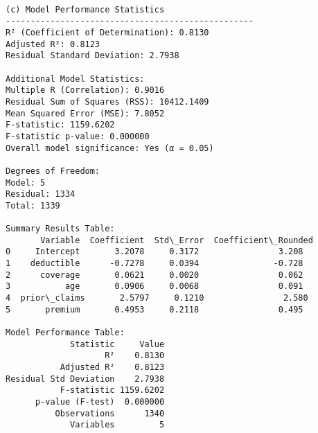 \documentclass[8pt, twocolumn]{extarticle}
\begin{document}
    \begin{Verbatim}[commandchars=\\\{\}]

(c) Model Performance Statistics
--------------------------------------------------
R² (Coefficient of Determination): 0.8130
Adjusted R²: 0.8123
Residual Standard Deviation: 2.7938

Additional Model Statistics:
Multiple R (Correlation): 0.9016
Residual Sum of Squares (RSS): 10412.1409
Mean Squared Error (MSE): 7.8052
F-statistic: 1159.6202
F-statistic p-value: 0.000000
Overall model significance: Yes (α = 0.05)

Degrees of Freedom:
Model: 5
Residual: 1334
Total: 1339

Summary Results Table:
       Variable  Coefficient  Std\_Error  Coefficient\_Rounded
0     Intercept       3.2078     0.3172                3.208
1    deductible      -0.7278     0.0394               -0.728
2      coverage       0.0621     0.0020                0.062
3           age       0.0906     0.0068                0.091
4  prior\_claims       2.5797     0.1210                2.580
5       premium       0.4953     0.2118                0.495

Model Performance Table:
             Statistic     Value
                    R²    0.8130
           Adjusted R²    0.8123
Residual Std Deviation    2.7938
           F-statistic 1159.6202
      p-value (F-test)  0.000000
          Observations      1340
             Variables         5
    \end{Verbatim}

    \begin{center}
    \end{center}
    { \hspace*{\fill} \\}
    
\end{document}
